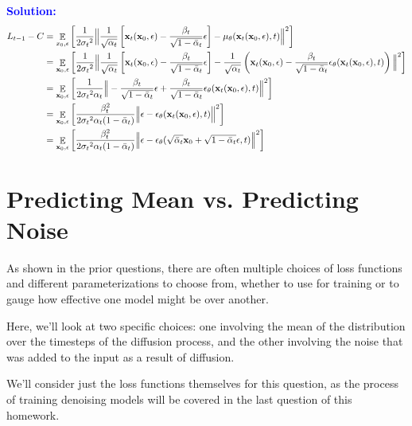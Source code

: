 \documentclass{article}
\DeclareMathOperator{\EX}{\mathbb{E}}%
\begin{document}
\begin{enumerate}
\textcolor{blue}{
    \textbf{Solution: } 
    \begin{align*}
    L_{t-1} - C &= \EX_{x_0, \epsilon}\left[\frac{1}{2{\sigma_t}^2}
    \Big\lVert \frac{1}{\sqrt{\alpha_t}}\left[\textbf{x}_t(\textbf{x}_0, \epsilon) - \frac{\beta_t}{\sqrt{1 - \Bar{\alpha}_t}}\epsilon\right] - {\mu_\theta}(\textbf{x}_t(\textbf{x}_0, \epsilon), t)\Big\rVert^2\right] \\
    &= \EX_{\textbf{x}_0, \epsilon}\left[\frac{1}{2{\sigma_t}^2}
    \Big\lVert \frac{1}{\sqrt{\alpha_t}}\left[\textbf{x}_t(\textbf{x}_0, \epsilon) - \frac{\beta_t}{\sqrt{1 - \Bar{\alpha}_t}}\epsilon\right] - \frac{1}{\sqrt{\alpha_t}}\left(\textbf{x}_t(\textbf{x}_0, \epsilon) - \frac{\beta_t}{\sqrt{1 - \Bar{\alpha}_t}}\epsilon_\theta(\textbf{x}_t(\textbf{x}_0, \epsilon), t)\right)\Big\rVert^2\right] \\
    &= \EX_{\textbf{x}_0, \epsilon}\left[\frac{1}{2{\sigma_t}^2\alpha_t}
    \Big\lVert - \frac{\beta_t}{\sqrt{1 - \Bar{\alpha}_t}}\epsilon +  \frac{\beta_t}{\sqrt{1 - \Bar{\alpha}_t}}\epsilon_\theta(\textbf{x}_t(\textbf{x}_0, \epsilon), t)\Big\rVert^2\right] \\
    &= \EX_{\textbf{x}_0, \epsilon}\left[\frac{\beta_t^2}{2{\sigma_t}^2\alpha_t(1 - \Bar{\alpha}_t)}
    \Big\lVert \epsilon - \epsilon_\theta(\textbf{x}_t(\textbf{x}_0, \epsilon), t)\Big\rVert^2\right] \\
    &= \EX_{\textbf{x}_0, \epsilon}\left[\frac{\beta_t^2}{2{\sigma_t}^2\alpha_t(1 - \Bar{\alpha}_t)}
    \Big\lVert \epsilon - \epsilon_\theta(\sqrt{\Bar{\alpha}_t}\textbf{x}_0 + \sqrt{1 - \Bar{\alpha}_t}\epsilon, t)\Big\rVert^2\right]
    \end{align*}}
\end{enumerate}


\section{Predicting Mean vs. Predicting Noise}

As shown in the prior questions, there are often multiple choices of loss functions and different parameterizations to choose from, whether to use for training or to gauge how effective one model might be over another.

Here, we'll look at two specific choices: one involving the mean of the distribution over the timesteps of the diffusion process, and the other involving the noise that was added to the input as a result of diffusion.

We'll consider just the loss functions themselves for this question, as the process of training denoising models will be covered in the last question of this homework.
\end{document}
